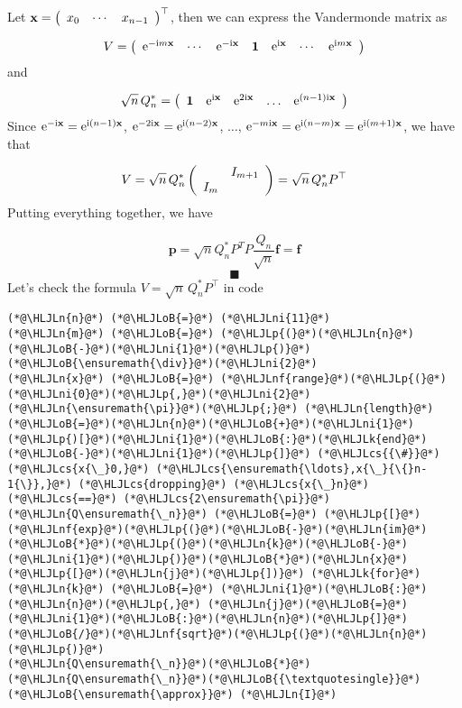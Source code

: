 \documentclass[12pt,a4paper]{article}
\newcommand{\HLJLk}[1]{\textcolor[RGB]{148,91,176}{\textbf{#1}}}
\newcommand{\HLJLn}[1]{#1}
\newcommand{\HLJLnf}[1]{\textcolor[RGB]{66,102,213}{#1}}
\newcommand{\HLJLni}[1]{\textcolor[RGB]{59,151,46}{#1}}
\newcommand{\HLJLoB}[1]{\textcolor[RGB]{102,102,102}{\textbf{#1}}}
\newcommand{\HLJLp}[1]{#1}
\newcommand{\HLJLcs}[1]{\textcolor[RGB]{153,153,119}{\textit{#1}}}
\begin{document}
Let $\mathbf{x} = \left(\begin{array}{c c c} x_0 & \cdots & x_{n-1}  \end{array}\right)^{\top}$, then we can express the Vandermonde matrix as

\[
V = 
\left(
\begin{array}{c c c c c c c}
{\rm e}^{-{\rm i}m\mathbf{x}}  & \cdots & {\rm e}^{-{\rm i}\mathbf{x}} &\mathbf{1}  & {\rm e}^{{\rm i}\mathbf{x}} & \cdots & {\rm e}^{{\rm i}m\mathbf{x}}
\end{array}
\right)
\]
and

\[
\sqrt{n}\,Q_n^* = \left(
\begin{array}{c c c c c}
\mathbf{1}  & {\rm e}^{{\rm i}\mathbf{x}} & {\rm e}^{2{\rm i}\mathbf{x}} & \ldots & {\rm e}^{(n-1){\rm i}\mathbf{x}}
\end{array}
\right)
\]
Since ${\rm e}^{-{\rm i}\mathbf{x}} = {\rm e}^{{\rm i}(n-1)\mathbf{x}}$, ${\rm e}^{-2{\rm i}\mathbf{x}} = {\rm e}^{{\rm i}(n-2)\mathbf{x}}$, $\dots$, ${\rm e}^{-m{\rm i}\mathbf{x}} = {\rm e}^{{\rm i}(n-m)\mathbf{x}} = {\rm e}^{{\rm i}(m+1)\mathbf{x}}$, we have that

\[
V = \sqrt{n}\,Q_n^*\left(
\begin{array}{c c}
 & I_{m+1} \\
I_m &
\end{array}
\right) =  \sqrt{n}\,Q_n^* P^{\top}
\]
Putting everything together, we have

\[
\mathbf{p} = \sqrt{n}Q_n^* P^{T} P \frac{Q_n}{\sqrt{n}}\mathbf{f} = \mathbf{f}
\]
\[
\blacksquare
\]
Let's check the formula $V = \sqrt{n}\,Q_n^* P^{\top}$ in code


\begin{lstlisting}
(*@\HLJLn{n}@*) (*@\HLJLoB{=}@*) (*@\HLJLni{11}@*)
(*@\HLJLn{m}@*) (*@\HLJLoB{=}@*) (*@\HLJLp{(}@*)(*@\HLJLn{n}@*)(*@\HLJLoB{-}@*)(*@\HLJLni{1}@*)(*@\HLJLp{)}@*)(*@\HLJLoB{\ensuremath{\div}}@*)(*@\HLJLni{2}@*)
(*@\HLJLn{x}@*) (*@\HLJLoB{=}@*) (*@\HLJLnf{range}@*)(*@\HLJLp{(}@*)(*@\HLJLni{0}@*)(*@\HLJLp{,}@*)(*@\HLJLni{2}@*)(*@\HLJLn{\ensuremath{\pi}}@*)(*@\HLJLp{;}@*) (*@\HLJLn{length}@*)(*@\HLJLoB{=}@*)(*@\HLJLn{n}@*)(*@\HLJLoB{+}@*)(*@\HLJLni{1}@*)(*@\HLJLp{)[}@*)(*@\HLJLni{1}@*)(*@\HLJLoB{:}@*)(*@\HLJLk{end}@*)(*@\HLJLoB{-}@*)(*@\HLJLni{1}@*)(*@\HLJLp{]}@*) (*@\HLJLcs{{\#}}@*) (*@\HLJLcs{x{\_}0,}@*) (*@\HLJLcs{\ensuremath{\ldots},x{\_}{\{}n-1{\}},}@*) (*@\HLJLcs{dropping}@*) (*@\HLJLcs{x{\_}n}@*) (*@\HLJLcs{==}@*) (*@\HLJLcs{2\ensuremath{\pi}}@*)
(*@\HLJLn{Q\ensuremath{\_n}}@*) (*@\HLJLoB{=}@*) (*@\HLJLp{[}@*)(*@\HLJLnf{exp}@*)(*@\HLJLp{(}@*)(*@\HLJLoB{-}@*)(*@\HLJLn{im}@*)(*@\HLJLoB{*}@*)(*@\HLJLp{(}@*)(*@\HLJLn{k}@*)(*@\HLJLoB{-}@*)(*@\HLJLni{1}@*)(*@\HLJLp{)}@*)(*@\HLJLoB{*}@*)(*@\HLJLn{x}@*)(*@\HLJLp{[}@*)(*@\HLJLn{j}@*)(*@\HLJLp{])}@*) (*@\HLJLk{for}@*) (*@\HLJLn{k}@*) (*@\HLJLoB{=}@*) (*@\HLJLni{1}@*)(*@\HLJLoB{:}@*)(*@\HLJLn{n}@*)(*@\HLJLp{,}@*) (*@\HLJLn{j}@*)(*@\HLJLoB{=}@*)(*@\HLJLni{1}@*)(*@\HLJLoB{:}@*)(*@\HLJLn{n}@*)(*@\HLJLp{]}@*)(*@\HLJLoB{/}@*)(*@\HLJLnf{sqrt}@*)(*@\HLJLp{(}@*)(*@\HLJLn{n}@*)(*@\HLJLp{)}@*)
(*@\HLJLn{Q\ensuremath{\_n}}@*)(*@\HLJLoB{*}@*)(*@\HLJLn{Q\ensuremath{\_n}}@*)(*@\HLJLoB{{\textquotesingle}}@*) (*@\HLJLoB{\ensuremath{\approx}}@*) (*@\HLJLn{I}@*)
\end{lstlisting}
\end{document}
